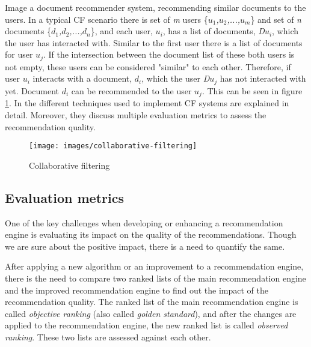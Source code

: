 Image a document recommender system, recommending similar documents to the users. In a typical CF scenario there is set of \emph{m} users \{\emph{$u_{1}$,$u_{2}$,...,$u_{m}$}\} and set of \emph{n} documents \{\emph{$d_{1}$,$d_{2}$,...,$d_{n}$}\}, and each user, \emph{$u_{i}$}, has a list of documents, \emph{D$u_{i}$}, which the user has interacted with. Similar to the first user there is a list of documents for user \emph{$u_{j}$}. If the intersection between the document list of these both users is not empty, these users can be considered "similar" to each other. Therefore, if user \emph{$u_{i}$} interacts with a document, \emph{$d_{i}$}, which the user \emph{D$u_{j}$} has not interacted with yet. Document \emph{$d_{i}$} can be recommended to the user \emph{$u_{j}$}. This can be seen in figure \ref{fig:collaborative-filtering}.
In \cite{su2009survey} the different techniques used to implement CF systems are explained in detail. Moreover, they discuss multiple evaluation metrics to assess the recommendation quality.


\begin{figure}[!h]
	\centering
	\texttt{[image: images/collaborative-filtering]}
	\caption{Collaborative filtering}
	\label{fig:collaborative-filtering}
\end{figure}



\subsection{Evaluation metrics}
\label{subsec:evaluation-metrics}
One of the key challenges when developing or enhancing a recommendation engine is evaluating its impact on the quality of the recommendations. Though we are sure about the positive impact, there is a need to quantify the same.

After applying a new algorithm or an improvement to a recommendation engine, there is the need to compare two ranked lists of the main recommendation engine and the improved recommendation engine to find out the impact of the recommendation quality. The ranked list of the main recommendation engine is called \emph{objective ranking} (also called \emph{golden standard}), and after the changes are applied to the recommendation engine, the new ranked list is called \emph{observed ranking}. These two lists are assessed against each other.


